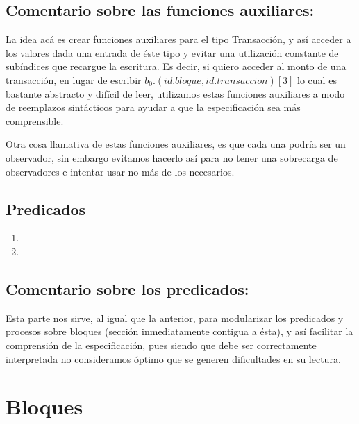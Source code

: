 \documentclass[10pt,a4paper]{article}
\begin{document}
\subsection{Comentario sobre las funciones auxiliares: }

La idea acá es crear funciones auxiliares para el tipo Transacción, y así acceder a los valores dada una entrada de éste tipo y evitar una utilización constante de subíndices que recargue la escritura. Es decir, si quiero acceder al monto de una transacción, en lugar de escribir $b_0.(id.bloque,id.transaccion)[3]$ lo cual es bastante abstracto y difícil de leer, utilizamos estas funciones auxiliares a modo de reemplazos sintácticos para ayudar a que la especificación sea más comprensible.

Otra cosa llamativa de estas funciones auxiliares, es que cada una podría ser un observador, sin embargo evitamos hacerlo así para no tener una sobrecarga de observadores e intentar usar no más de los necesarios.

\subsection{Predicados}
\begin{enumerate}
    \item {} 

    \item {} 
\end{enumerate}

\subsection{Comentario sobre los predicados: }

Esta parte nos sirve, al igual que la anterior, para modularizar los predicados y procesos sobre bloques (sección inmediatamente contigua a ésta), y así facilitar la comprensión de la especificación, pues siendo que debe ser correctamente interpretada no consideramos óptimo que se generen dificultades en su lectura.

\section{Bloques}
\end{document}
